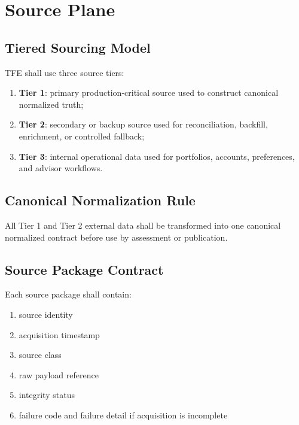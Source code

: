 \chapter{Source Plane}
\section{Tiered Sourcing Model}

TFE shall use three source tiers:
\begin{enumerate}[leftmargin=1.2cm]
    \item \textbf{Tier 1}: primary production-critical source used to construct canonical normalized truth;
    \item \textbf{Tier 2}: secondary or backup source used for reconciliation, backfill, enrichment, or controlled fallback;
    \item \textbf{Tier 3}: internal operational data used for portfolios, accounts, preferences, and advisor workflows.
\end{enumerate}

\section{Canonical Normalization Rule}
All Tier 1 and Tier 2 external data shall be transformed into one canonical normalized contract before use by assessment or publication.

\section{Source Package Contract}
Each source package shall contain:
\begin{enumerate}[leftmargin=1.2cm]
    \item source identity
    \item acquisition timestamp
    \item source class
    \item raw payload reference
    \item integrity status
    \item failure code and failure detail if acquisition is incomplete
\end{enumerate}

